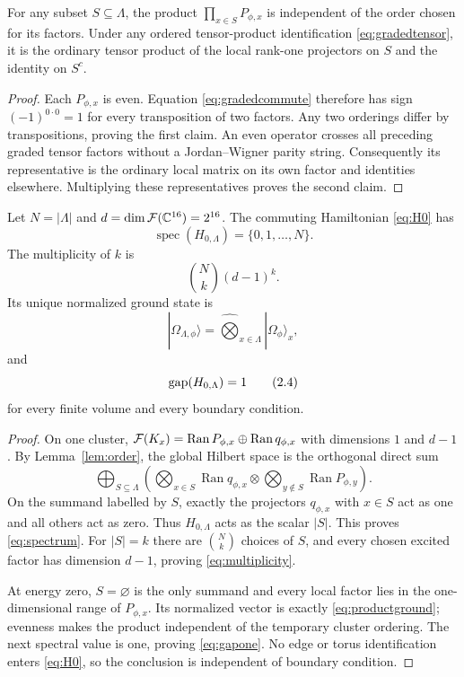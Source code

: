 \begin{lemma}
\label{lem:order}
For any subset $S\subseteq\Lambda$, the product
$\prod_{x\in S}P_{\phi,x}$ is independent of the order chosen for its
factors.  Under any ordered tensor-product identification
\eqref{eq:gradedtensor}, it is the ordinary tensor product of the local
rank-one projectors on $S$ and the identity on $S^c$.
\end{lemma}

\begin{proof}
Each $P_{\phi,x}$ is even.  Equation \eqref{eq:gradedcommute} therefore
has sign $(-1)^{0\cdot0}=1$ for every transposition of two factors.
Any two orderings differ by transpositions, proving the first claim.
An even operator crosses all preceding graded tensor factors without a
Jordan--Wigner parity string.  Consequently its representative is the
ordinary local matrix on its own factor and identities elsewhere.
Multiplying these representatives proves the second claim.
\end{proof}

\begin{theorem}
\label{thm:T1}
Let $N=|\Lambda|$ and $d=\dim\mathcal F(\mathbb C^{16})=2^{16}$.  The commuting
Hamiltonian \eqref{eq:H0} has
\[
 \operatorname{spec}(H_{0,\Lambda})=\{0,1,\ldots,N\}.
\tag{2.1}\label{eq:spectrum}
\]
The multiplicity of $k$ is
\[
 \binom Nk(d-1)^k.
\tag{2.2}\label{eq:multiplicity}
\]
Its unique normalized ground state is
\[
 |\Omega_{\Lambda,\phi}\rangle
 =\widehat{\bigotimes}_{x\in\Lambda}|\Omega_\phi\rangle_x,
\tag{2.3}\label{eq:productground}
\]
and
\[
 \operatorname{gap}(H_{0,\Lambda})=1
\tag{2.4}\label{eq:gapone}
\]
for every finite volume and every boundary condition.
\end{theorem}

\begin{proof}
On one cluster,
$\mathcal F(K_x)=\operatorname{Ran}P_{\phi,x}\oplus
\operatorname{Ran}q_{\phi,x}$ with dimensions $1$ and $d-1$.
By Lemma~\ref{lem:order}, the global Hilbert space is the orthogonal
direct sum
\[
 \bigoplus_{S\subseteq\Lambda}
 \left(
 \bigotimes_{x\in S}\operatorname{Ran}q_{\phi,x}
 \otimes
 \bigotimes_{y\notin S}\operatorname{Ran}P_{\phi,y}
 \right).
\tag{2.5}\label{eq:syndrome}
\]
On the summand labelled by $S$, exactly the projectors $q_{\phi,x}$
with $x\in S$ act as one and all others act as zero.  Thus
$H_{0,\Lambda}$ acts as the scalar $|S|$.  This proves
\eqref{eq:spectrum}.  For $|S|=k$ there are $\binom Nk$ choices of
$S$, and every chosen excited factor has dimension $d-1$, proving
\eqref{eq:multiplicity}.

At energy zero, $S=\varnothing$ is the only summand and every local
factor lies in the one-dimensional range of $P_{\phi,x}$.  Its
normalized vector is exactly \eqref{eq:productground}; evenness makes
the product independent of the temporary cluster ordering.  The next
spectral value is one, proving \eqref{eq:gapone}.  No edge or torus
identification enters \eqref{eq:H0}, so the conclusion is independent
of boundary condition.
\end{proof}

